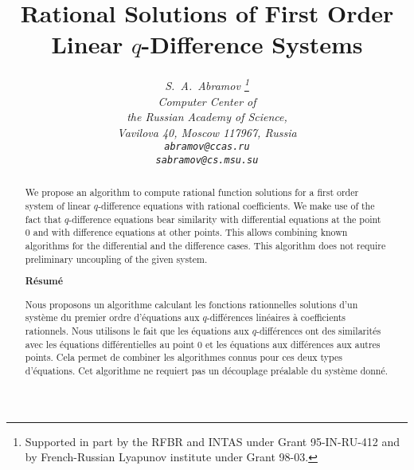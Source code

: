 
\newcommand {\cRp} {{\cal R}_q}
\newcommand {\ord}{\mathop{\rm ord}}
\newcommand {\lcm}{\mathop{\rm lcm}}
\newcommand {\lc}{\mathop{\rm lc}}
\newcommand {\qed}{\hfill$\Box$\par\medskip}
\newtheorem{Theorem}{Theorem}
\newtheorem{Lemma}{Lemma}
\def\o{\circ}
\def\wt{\widetilde}
\title{\Large\bf
Rational Solutions of
First Order Linear $q$-Difference Systems
}

\author{\large\sl S.~A.~Abramov
\thanks{Supported in part by
the RFBR and INTAS under Grant 95-IN-RU-412
and by French-Russian Lyapunov institute
under Grant 98-03.}
\\
\normalsize Computer Center of\\
\normalsize the Russian Academy of Science, \\
\normalsize Vavilova 40, Moscow 117967, Russia \\
\normalsize {\tt abramov@ccas.ru}\\
\normalsize {\tt sabramov@cs.msu.su}
}



\date{}

\maketitle

\begin{abstract}
We propose an algorithm to compute rational
function solutions for a first order system
of linear $q$-difference equations
with rational coefficients.
We make use of the fact
that $q$-difference equations bear similarity with
differential equations at the point 0 and with difference equations
at other points. This allows combining known algorithms for the
differential and the difference cases.
This algorithm does not require
preliminary uncoupling of the given system.
\begin{center}
\bf R\'esum\'e
\end{center}

Nous proposons un algorithme calculant les fonctions rationnelles
solutions d'un syst\`eme  du premier ordre d'\'equations aux
$q$-diff\'erences lin\'eaires \`a coefficients rationnels. Nous
utilisons le fait que les \'equations aux $q$-diff\'erences ont des
similarit\'es avec les \'equations diff\'erentielles au point 0 et
les \'equations aux diff\'erences aux autres points. Cela permet
de combiner les algorithmes connus pour ces deux types d'\'equations.
Cet algorithme ne requiert pas un d\'ecouplage
 pr\'ealable du
syst\`eme donn\'e.
\end{abstract}
